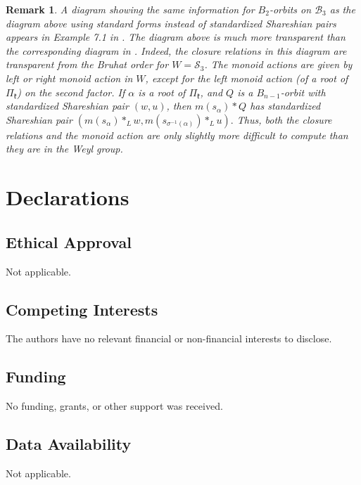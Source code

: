 \documentclass[12pt]{amsart}
\numberwithin{equation}{section}
\newtheorem{rem}[thm]{Remark}
\newcommand{\fk}{\mbox{${\mathfrak k}$}}
\newcommand{\B}{\mathcal{B}}
\newcommand{\ms}{m(s_{\alpha})}
\begin{document}
\begin{rem}
A diagram showing the same information for $B_2$-orbits on $\B_{3}$ as the diagram above using standard forms instead of standardized Shareshian pairs appears in Example 7.1 in \cite{CE21II}.    The diagram above is much more transparent than the corresponding diagram in \cite{CE21II}.  Indeed, the closure relations in this diagram are transparent from the Bruhat order for $W={\mathcal S}_3$.  The monoid actions are given by left or right monoid action in $W$, except for the left monoid action (of a root of $\Pi_{\fk}$) on the second factor.  If $\alpha$ is a root of $\Pi_{\fk}$, and $Q$ is a $B_{n-1}$-orbit with standardized Shareshian pair $(w,u)$, then $\ms*Q$  has standardized Shareshian pair $(m(s_{\alpha})*_{L}w,m(s_{\sigma^{-1}(\alpha)})*_{L}u).$   Thus, both the closure relations and the monoid action are only slightly more difficult to compute than they are in the Weyl group.
\end{rem}

\section{Declarations} 

\subsection{Ethical Approval}
Not applicable.
\subsection{Competing Interests}
The authors have no relevant financial or non-financial interests to disclose. 
\subsection{Funding}
No funding, grants, or other support was received.
\subsection{Data Availability} 

Not applicable.






\end{document}
